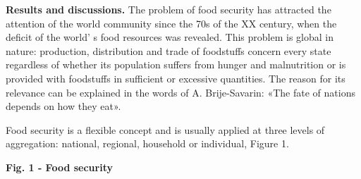 \begin{multicols}{2}
{\bfseries Results and discussions.} The problem of food security has
attracted the attention of the world community since the 70s of the XX
century, when the deficit of the world' s food resources
was revealed. This problem is global in nature: production, distribution
and trade of foodstuffs concern every state regardless of whether its
population suffers from hunger and malnutrition or is provided with
foodstuffs in sufficient or excessive quantities. The reason for its
relevance can be explained in the words of A. Brije-Savarin: «The fate
of nations depends on how they eat».

Food security is a flexible concept and is usually applied at three
levels of aggregation: national, regional, household or individual,
Figure 1.
\end{multicols}

{\bfseries Fig. 1 - Food security}

